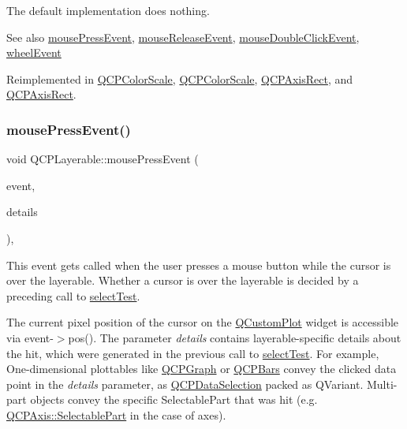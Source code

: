The default implementation does nothing.

\begin{DoxySeeAlso}{See also}
\hyperlink{class_q_c_p_layerable_af6567604818db90f4fd52822f8bc8376}{mouse\+Press\+Event}, \hyperlink{class_q_c_p_layerable_aa0d79b005686f668622bbe66ac03ba2c}{mouse\+Release\+Event}, \hyperlink{class_q_c_p_layerable_a4171e2e823aca242dd0279f00ed2de81}{mouse\+Double\+Click\+Event}, \hyperlink{class_q_c_p_layerable_a47dfd7b8fd99c08ca54e09c362b6f022}{wheel\+Event} 
\end{DoxySeeAlso}


Reimplemented in \hyperlink{class_q_c_p_color_scale_a3b2bd79725aefaf2630fc76e90939442}{Q\+C\+P\+Color\+Scale}, \hyperlink{class_q_c_p_color_scale_a57afb0708a8ecec9ae0feb4536f7e933}{Q\+C\+P\+Color\+Scale}, \hyperlink{class_q_c_p_axis_rect_a9cd27ad8c5cfb49aefd9dbb30def4beb}{Q\+C\+P\+Axis\+Rect}, and \hyperlink{class_q_c_p_axis_rect_a96e89068c5d9859f777d269fc277667a}{Q\+C\+P\+Axis\+Rect}.

\mbox{\label{class_q_c_p_layerable_af6567604818db90f4fd52822f8bc8376}} 
\subsubsection{\texorpdfstring{mouse\+Press\+Event()}{mousePressEvent()}}
{\footnotesize\ttfamily void Q\+C\+P\+Layerable\+::mouse\+Press\+Event (\begin{DoxyParamCaption}\item[{Q\+Mouse\+Event $\ast$}]{event,  }\item[{const Q\+Variant \&}]{details }\end{DoxyParamCaption})\hspace{0.3cm}{\ttfamily [protected]}, {\ttfamily [virtual]}}

This event gets called when the user presses a mouse button while the cursor is over the layerable. Whether a cursor is over the layerable is decided by a preceding call to \hyperlink{class_q_c_p_layerable_a04db8351fefd44cfdb77958e75c6288e}{select\+Test}.

The current pixel position of the cursor on the \hyperlink{class_q_custom_plot}{Q\+Custom\+Plot} widget is accessible via {\ttfamily event-\/$>$pos()}. The parameter {\itshape details} contains layerable-\/specific details about the hit, which were generated in the previous call to \hyperlink{class_q_c_p_layerable_a04db8351fefd44cfdb77958e75c6288e}{select\+Test}. For example, One-\/dimensional plottables like \hyperlink{class_q_c_p_graph}{Q\+C\+P\+Graph} or \hyperlink{class_q_c_p_bars}{Q\+C\+P\+Bars} convey the clicked data point in the {\itshape details} parameter, as \hyperlink{class_q_c_p_data_selection}{Q\+C\+P\+Data\+Selection} packed as Q\+Variant. Multi-\/part objects convey the specific {\ttfamily Selectable\+Part} that was hit (e.\+g. \hyperlink{class_q_c_p_axis_abee4c7a54c468b1385dfce2c898b115f}{Q\+C\+P\+Axis\+::\+Selectable\+Part} in the case of axes).

